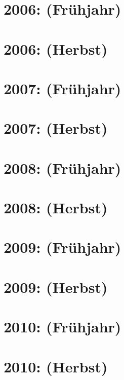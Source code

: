 \documentclass{lehramt-informatik-haupt}
\begin{document}
\section{2006: (Frühjahr)}


\section{2006: (Herbst)}


\section{2007: (Frühjahr)}


\section{2007: (Herbst)}


\section{2008: (Frühjahr)}


\section{2008: (Herbst)}


\section{2009: (Frühjahr)}


\section{2009: (Herbst)}


\section{2010: (Frühjahr)}


\section{2010: (Herbst)}

\end{document}
